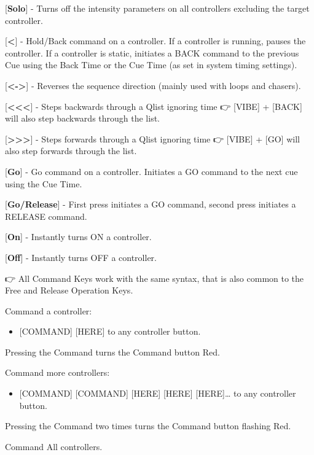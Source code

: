 \documentclass[
]{article}
\providecommand{\tightlist}{%
  \setlength{\itemsep}{0pt}\setlength{\parskip}{0pt}}
\begin{document}
{[}\textbf{Solo}{]} - Turns off the intensity parameters on all controllers excluding the target controller.

{[}\textbf{\textbar\textbar\textless{}}{]} - Hold/Back command on a controller. If a controller is running, pauses the controller. If a controller is static, initiates a BACK command to the previous Cue using the Back Time or the Cue Time (as set in system timing settings).

{[}\textbf{\textless-\textgreater{}}{]} - Reverses the sequence direction (mainly used with loops and chasers).

{[}\textbf{\textless\textless\textless{}}{]} - Steps backwards through a Qlist ignoring time 👉 {[}VIBE{]} + {[}BACK{]} will also step backwards through the list.

{[}\textbf{\textgreater\textgreater\textgreater{}}{]} - Steps forwards through a Qlist ignoring time 👉 {[}VIBE{]} + {[}GO{]} will also step forwards through the list.

{[}\textbf{Go}{]} - Go command on a controller. Initiates a GO command to the next cue using the Cue Time.

{[}\textbf{Go/Release}{]} - First press initiates a GO command, second press initiates a RELEASE command.

{[}\textbf{On}{]} - Instantly turns ON a controller.

{[}\textbf{Off}{]} - Instantly turns OFF a controller.

👉 All Command Keys work with the same syntax, that is also common to the Free and Release Operation Keys.

Command a controller:

\begin{itemize}
\tightlist
\item
  {[}COMMAND{]} {[}HERE{]} to any controller button.
\end{itemize}

Pressing the Command turns the Command button {Red}.

Command more controllers:

\begin{itemize}
\tightlist
\item
  {[}COMMAND{]} {[}COMMAND{]} {[}HERE{]} {[}HERE{]} {[}HERE{]}\ldots{} to any controller button.
\end{itemize}

Pressing the Command two times turns the Command button {flashing Red}.

Command All controllers.
\end{document}

